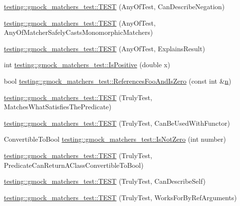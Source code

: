 \begin{DoxyCompactItemize}
\item 
\hyperlink{namespacetesting_1_1gmock__matchers__test_acc5e849e0765f00a48581e9480f3c8e2}{testing\+::gmock\+\_\+matchers\+\_\+test\+::\+T\+E\+ST} (Any\+Of\+Test, Can\+Describe\+Negation)
\item 
\hyperlink{namespacetesting_1_1gmock__matchers__test_a8fb1598253450afeb0440682cd23999e}{testing\+::gmock\+\_\+matchers\+\_\+test\+::\+T\+E\+ST} (Any\+Of\+Test, Any\+Of\+Matcher\+Safely\+Casts\+Monomorphic\+Matchers)
\item 
\hyperlink{namespacetesting_1_1gmock__matchers__test_ad4c09014fce6029575e2c337cde85bdf}{testing\+::gmock\+\_\+matchers\+\_\+test\+::\+T\+E\+ST} (Any\+Of\+Test, Explains\+Result)
\item 
int \hyperlink{namespacetesting_1_1gmock__matchers__test_a70e728cf67d0224c3ebb9eb8959cc39d}{testing\+::gmock\+\_\+matchers\+\_\+test\+::\+Is\+Positive} (double x)
\item 
bool \hyperlink{namespacetesting_1_1gmock__matchers__test_abdce9daf2e3d3721d68f76680129f03b}{testing\+::gmock\+\_\+matchers\+\_\+test\+::\+References\+Foo\+And\+Is\+Zero} (const int \&\hyperlink{app_2main_8cpp_acfc02ec89670db29251fda6a66602ce2}{n})
\item 
\hyperlink{namespacetesting_1_1gmock__matchers__test_ab7761562a8ffea67a485f3f649f6430a}{testing\+::gmock\+\_\+matchers\+\_\+test\+::\+T\+E\+ST} (Truly\+Test, Matches\+What\+Satisfies\+The\+Predicate)
\item 
\hyperlink{namespacetesting_1_1gmock__matchers__test_ab3e259f3ae45e199474d7c6d554852f0}{testing\+::gmock\+\_\+matchers\+\_\+test\+::\+T\+E\+ST} (Truly\+Test, Can\+Be\+Used\+With\+Functor)
\item 
Convertible\+To\+Bool \hyperlink{namespacetesting_1_1gmock__matchers__test_a248045bc57c8bad87b7d185b5c292f60}{testing\+::gmock\+\_\+matchers\+\_\+test\+::\+Is\+Not\+Zero} (int number)
\item 
\hyperlink{namespacetesting_1_1gmock__matchers__test_a24529fd7834d272009af74106422fe54}{testing\+::gmock\+\_\+matchers\+\_\+test\+::\+T\+E\+ST} (Truly\+Test, Predicate\+Can\+Return\+A\+Class\+Convertible\+To\+Bool)
\item 
\hyperlink{namespacetesting_1_1gmock__matchers__test_af474a9719e614d521c71bdf7c39f6a7a}{testing\+::gmock\+\_\+matchers\+\_\+test\+::\+T\+E\+ST} (Truly\+Test, Can\+Describe\+Self)
\item 
\hyperlink{namespacetesting_1_1gmock__matchers__test_ae702d436c52bd37fe3e8d405d7e6a691}{testing\+::gmock\+\_\+matchers\+\_\+test\+::\+T\+E\+ST} (Truly\+Test, Works\+For\+By\+Ref\+Arguments)

\end{DoxyCompactItemize}
